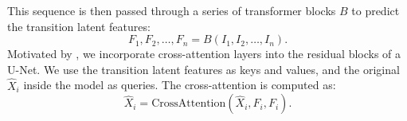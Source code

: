 This sequence is then passed through a series of transformer blocks $B$ to predict the transition latent features:
\begin{equation}
F_1, F_2, \dots, F_n = B(I_1, I_2, \dots, I_n).
\end{equation}
Motivated by \citet{khachatryan2023text2video}, we incorporate cross-attention layers into the residual blocks of a U-Net. We use the transition latent features as keys and values, and the original $\hat{X}_i$ inside the model as queries. The cross-attention is computed as:
\begin{equation}
\hat{X}_i = \text{CrossAttention}(\hat{X}_i, F_i, F_i).
\end{equation}










